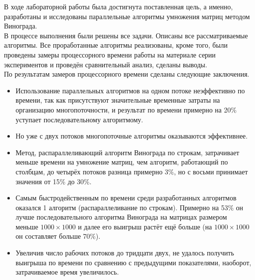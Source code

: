 В ходе лабораторной работы была достигнута поставленная цель, а именно, разработаны и исследованы параллельные алгоритмы умножения матриц методом Винограда.\\

В процессе выполнения были решены все задачи. Описаны все рассматриваемые алгоритмы. Все проработанные алгоритмы реализованы, кроме того, были проведены замеры процессорного времени работы на материале серии экспериментов и проведён сравнительный анализ, сделаны выводы.\\

По результатам замеров процессорного времени сделаны следующие заключения.
\begin{itemize}
	\item Использование параллельных алгоритмов на одном потоке неэффективно по времени, так как присутствуют значительные временные затраты на организацию многопоточности, и результат по времени примерно на 20\% уступает последовательному алгоритмому. 
	\item Но уже с двух потоков многопоточные алгоритмы оказываются эффективнее.
	\item Метод, распараллеливающий алгоритм Винограда по строкам, затрачивает меньше времени на умножение матриц, чем алгоритм, работающий по столбцам, до четырёх потоков разница примерно 3\%, но с восьми принимает значения от 15\% до 30\%.
	\item Самым быстродейственным по времени среди разработанных алгоритмов оказался 1 алгоритм (распараллеливание по строкам). Примерно на 53\% он лучше последовательного алгоритма Винограда на матрицах размером меньше $1000 \times 1000$ и далее его выигрыш растёт ещё больше (на $1000 \times 1000$ он составляет больше 70\%).
	\item Увеличив число рабочих потоков до тридцати двух, не удалось получить выигрыша по времени по сравнению с предыдущими показателями, наоборот, затрачиваемое время увеличилось.
\end{itemize}